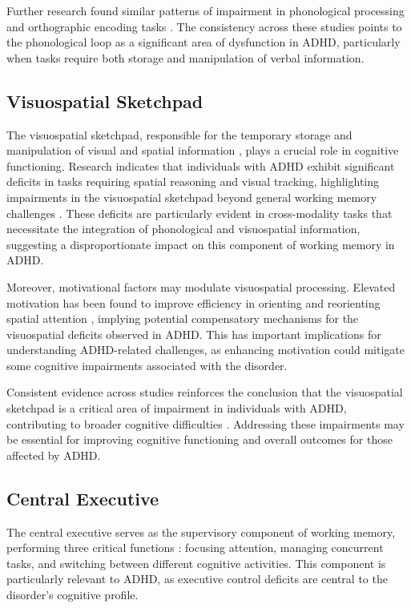 \documentclass[stu]{apa7}
\begin{document}
Further research found similar patterns of impairment in phonological processing and orthographic encoding tasks \parencite{raiker_phonological_2019}. The consistency across these studies points to the phonological loop as a significant area of dysfunction in ADHD, particularly when tasks require both storage and manipulation of verbal information.

\subsection{Visuospatial Sketchpad}

The visuospatial sketchpad, responsible for the temporary storage and manipulation of visual and spatial information \parencite{baddeley_developments_1994}, plays a crucial role in cognitive functioning. Research indicates that individuals with ADHD exhibit significant deficits in tasks requiring spatial reasoning and visual tracking, highlighting impairments in the visuospatial sketchpad beyond general working memory challenges \parencite{butzbach_basic_2019,elosua_differences_2017}. These deficits are particularly evident in cross-modality tasks that necessitate the integration of phonological and visuospatial information, suggesting a disproportionate impact on this component of working memory in ADHD.

Moreover, motivational factors may modulate visuospatial processing. Elevated motivation has been found to improve efficiency in orienting and reorienting spatial attention \parencite{engelmann_motivation_2007}, implying potential compensatory mechanisms for the visuospatial deficits observed in ADHD. This has important implications for understanding ADHD-related challenges, as enhancing motivation could mitigate some cognitive impairments associated with the disorder.

Consistent evidence across studies reinforces the conclusion that the visuospatial sketchpad is a critical area of impairment in individuals with ADHD, contributing to broader cognitive difficulties \parencite{butzbach_basic_2019,elosua_differences_2017,engelmann_motivation_2007}. Addressing these impairments may be essential for improving cognitive functioning and overall outcomes for those affected by ADHD.

\subsection{Central Executive}

The central executive serves as the supervisory component of working memory, performing three critical functions \parencite{baddeley_working_2012}: focusing attention, managing concurrent tasks, and switching between different cognitive activities. This component is particularly relevant to ADHD, as executive control deficits are central to the disorder's cognitive profile.
\end{document}

